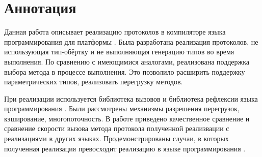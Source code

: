 \section*{Аннотация}
Данная работа описывает реализацию протоколов в компиляторе языка программирования  для платформы . Была разработана реализация протоколов, не использующая тип-обёртку и не выполняющая генерацию типов во время выполнения. По сравнению с имеющимися аналогами, реализована поддержка выбора метода в процессе выполнения. Это позволило расширить поддержку параметрических типов, реализовать перегрузку методов.

При реализации используется библиотека вызовов и библиотека рефлексии языка программирования . Были рассмотрены механизмы разрешения перегрузок, кэширование, многопоточность. В работе приведено качественное сравнение и сравнение скорости вызова метода протокола полученной реализвации с реализациями в других языках. Продемонстрированы случаи, в которых полученная реализация превосходит реализацию в языке программирования .

